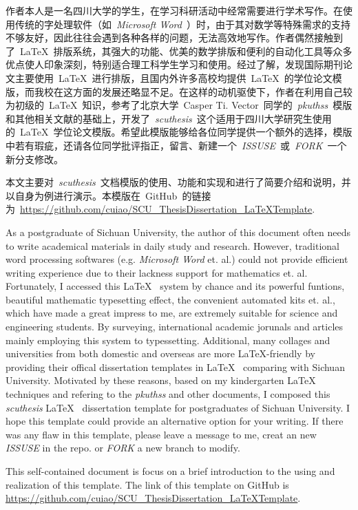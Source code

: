 \begin{CHSabstract}
	作者本人是一名四川大学的学生，在学习科研活动中经常需要进行学术写作。在使用传统的字处理软件（如~\emph{Microsoft\textsuperscript{\textregistered} Word}~）时，由于其对数学等特殊需求的支持不够友好，因此往往会遇到各种各样的问题，无法高效地写作。作者偶然接触到了~\LaTeX~排版系统，其强大的功能、优美的数学排版和便利的自动化工具等众多优点使人印象深刻，特别适合理工科学生学习和使用。经过了解，发现国际期刊论文主要使用~\LaTeX~进行排版，且国内外许多高校均提供~\LaTeX~的学位论文模版，而我校在这方面的发展还略显不足。在这样的动机驱使下，作者在利用自己较为初级的~\LaTeX~知识，参考了北京大学~Casper Ti. Vector~同学的~\emph{pkuthss}~模版和其他相关文献的基础上，开发了~\emph{scuthesis}~这个适用于四川大学研究生使用的~\LaTeX~学位论文模版。希望此模版能够给各位同学提供一个额外的选择，模版中若有瑕疵，还请各位同学批评指正，留言、新建一个~\emph{ISSUSE}~或~\emph{FORK}~一个新分支修改。


	本文主要对~\emph{scuthesis}~文档模版的使用、功能和实现和进行了简要介绍和说明，并以自身为例进行演示。本模版在~GitHub~的链接为~\url{https://github.com/cuiao/SCU_ThesisDissertation_LaTeXTemplate}.
\end{CHSabstract}

\begin{ENGabstract}
	As a postgraduate of Sichuan University, the author of this document often needs to write academical materials in daily study and research. However, traditional word processing softwares (e.g. \emph{Microsoft\textsuperscript{\textregistered} Word} et. al.) could not provide efficient writing experience due to their lackness support for mathematics et. al. Fortunately, I accessed this \LaTeX~ system by chance and its powerful funtions, beautiful mathematic typesetting effect, the convenient automated kits et. al., which have made a great impress to me, are extremely suitable for science and engineering students. By surveying, international academic jorunals and articles mainly employing this system to typessetting. Additional, many collages and universities from both domestic and overseas are more \LaTeX-friendly by providing their offical dissertation templates in \LaTeX~ comparing with Sichuan University. Motivated by these reasons, based on my kindergarten \LaTeX~ techniques and refering to the \emph{pkuthss} and other documents, I composed this \emph{scuthesis} \LaTeX~ dissertation template for postgraduates of Sichuan University. I hope this template could provide an alternative option for your writing. If there was any flaw in this template, please leave a message to me, creat an new \emph{ISSUSE} in the repo. or \emph{FORK} a new branch to modify.


	This self-contained document is focus on a brief introduction to the using and realization of this template. The link of this template on GitHub is \url{https://github.com/cuiao/SCU_ThesisDissertation_LaTeXTemplate}.
\end{ENGabstract}
